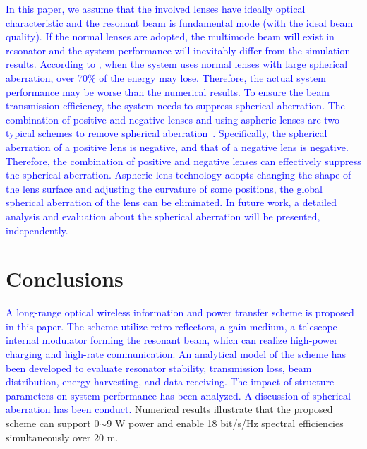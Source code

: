 \documentclass{IEEEtran}
\begin{document}
\textcolor{blue}{
In this paper, we assume that the involved lenses have ideally optical characteristic and the resonant beam is fundamental mode (with the ideal beam quality). 
If the normal lenses are adopted, the multimode beam will exist in resonator and the system performance will inevitably differ from the simulation results. According to \cite{Sheng21}, when the system uses normal lenses with large spherical aberration, over 70$\%$ of the energy may lose. Therefore, the actual system performance may be worse than the numerical results. %
To ensure the beam transmission efficiency, the system needs to suppress spherical aberration. The combination of positive and negative lenses and using aspheric lenses are two typical schemes to remove spherical aberration~\cite{Sa,liu2022large}. 
Specifically, the spherical aberration of a positive lens is negative, and that of a negative lens is negative. Therefore, the combination of positive and negative lenses can effectively suppress the spherical aberration. 
Aspheric lens technology adopts changing the shape of the lens surface and adjusting the curvature of some positions, the global spherical aberration of the lens can be eliminated. 
In future work, a detailed analysis and evaluation about the spherical aberration will be presented, independently.
}
\section{Conclusions}\label{conclusions}
\textcolor{blue}{A long-range optical wireless information and power transfer scheme is proposed in this paper. The scheme utilize retro-reflectors, a gain medium, a telescope internal modulator forming the resonant beam, which can realize high-power charging and high-rate communication. 
An analytical model of the scheme has been developed to evaluate resonator stability, transmission loss, beam distribution, energy harvesting, and data receiving. The impact of structure parameters on system performance has been analyzed. A discussion of spherical aberration has been conduct.}
Numerical results illustrate that the proposed scheme can support 0$\sim$9 W power and enable 18 bit/s/Hz spectral efficiencies simultaneously over 20 m.
\end{document}
